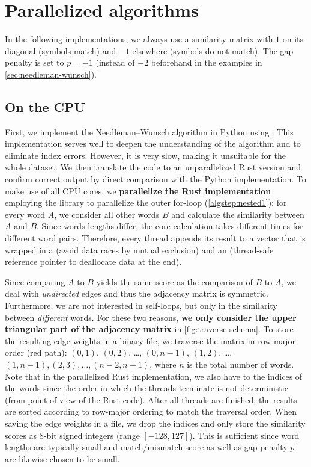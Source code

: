 \section{Parallelized algorithms}
\label{sec:impl}

In the following implementations, we always use a similarity matrix with $1$ on its diagonal (symbols match) and $-1$ elsewhere (symbols do not match). The gap penalty is set to $p=-1$ (instead of $-2$ beforehand in the examples in \autoref{sec:needleman-wunsch}).

\subsection{On the CPU}

First, we implement the Needleman–Wunsch algorithm in Python using . This implementation serves well to deepen the understanding of the algorithm and to eliminate index errors. However, it is very slow, making it unsuitable for the whole dataset. We then translate the code to an unparallelized Rust version and confirm correct output by direct comparison with the Python implementation. To make use of all CPU cores, we \textbf{parallelize the Rust implementation} employing the  library to parallelize the outer for-loop (\autoref{algstep:nested1}): for every word $A$, we consider all other words $B$ and calculate the similarity between $A$ and $B$. Since words lengths differ, the core calculation takes different times for different word pairs. Therefore, every thread appends its result to a vector that is wrapped in a  (avoid data races by mutual exclusion) and an  (thread-safe reference pointer to deallocate data at the end).

Since comparing $A$ to $B$ yields the same score as the comparison of $B$ to $A$, we deal with \textit{undirected} edges and thus the adjacency matrix is symmetric. Furthermore, we are not interested in self-loops, but only in the similarity between \textit{different} words. For these two reasons, \textbf{we only consider the upper triangular part of the adjacency matrix} in \autoref{fig:traverse-schema}. To store the resulting edge weights in a binary file, we traverse the matrix in row-major order (red path): $(0,1)$, $(0,2)$, \ldots, $(0,n-1)$, $(1,2)$, \ldots, $(1,n-1), (2,3), \ldots, (n-2,n-1)$, where $n$ is the total number of words. Note that in the parallelized Rust implementation, we also have to the indices of the words since the order in which the threads terminate is not deterministic (from point of view of the Rust code). After all threads are finished, the results are sorted according to row-major ordering to match the traversal order. When saving the edge weights in a file, we drop the indices and only store the similarity scores as 8-bit signed integers (range $[-128,127]$). This is sufficient since word lengths are typically small and match/mismatch score as well as gap penalty $p$ are likewise chosen to be small.



